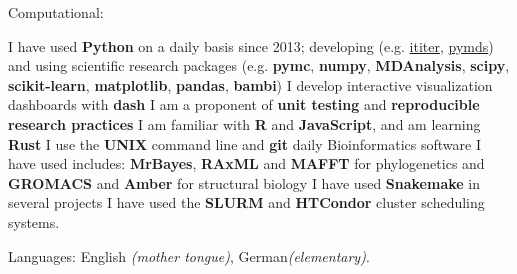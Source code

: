 \documentclass[10pt,a4paper]{article}
\begin{document}
\spacedhrule{0.9em}{-0.4em}


\inlineheadsection  %
{Computational:} {
  
  I have used \textbf{Python} on a daily basis since 2013; developing (e.g.\@
  \href{https://ititer.readthedocs.io/}{ititer},
  \href{https://pymds.readthedocs.io}{pymds}) and using scientific research packages
  (e.g. \textbf{pymc}, \textbf{numpy}, \textbf{MDAnalysis}, \textbf{scipy},
  \textbf{scikit-learn}, \textbf{matplotlib}, \textbf{pandas}, \textbf{bambi}) \sbull I
  develop interactive visualization dashboards with \textbf{dash} \sbull I am a proponent of
  \textbf{unit testing} and \textbf{reproducible research practices} \sbull I am familiar
  with \textbf{R} and \textbf{JavaScript}, and am learning \textbf{Rust} \sbull I use the
  \textbf{UNIX} command line and \textbf{git} daily \sbull Bioinformatics software I have
  used includes: \textbf{MrBayes}, \textbf{RAxML} and \textbf{MAFFT} for phylogenetics
  and \textbf{GROMACS} and \textbf{Amber} for structural biology \sbull I have used
  \textbf{Snakemake} in several projects \sbull I have used the \textbf{SLURM} and
  \textbf{HTCondor} cluster scheduling systems.}

\vspace{0.5em}
\inlineheadsection
{Languages:}
{English \emph{(mother tongue)}, German\emph{(elementary)}.}

\spacedhrule{1.6em}{-0.4em}

\nocite{*}
\printbibliography[title=Publications]

\spacedhrule{1.6em}{-0.4em}
\end{document}
